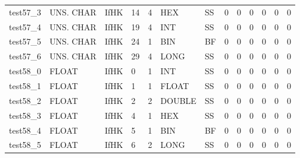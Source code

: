 \begin{longtable}{|l|l|l|p{0.5cm}|p{0.5cm}|l|p{0.5cm}|p{0.5cm}|p{0.5cm}|l|l|p{0.5cm}|l|}
test57\_3 & UNS. CHAR & IfHK & 14 & 4 & HEX & SS & 0 & 0 & 0 & 0 & 0 & 0 \\
test57\_4 & UNS. CHAR & IfHK & 19 & 4 & INT & SS & 0 & 0 & 0 & 0 & 0 & 0 \\
test57\_5 & UNS. CHAR & IfHK & 24 & 1 & BIN & BF & 0 & 0 & 0 & 0 & 0 & 0 \\
test57\_6 & UNS. CHAR & IfHK & 29 & 4 & LONG & SS & 0 & 0 & 0 & 0 & 0 & 0 \\
test58\_0 & FLOAT & IfHK & 0 & 1 & INT & SS & 0 & 0 & 0 & 0 & 0 & 0 \\
test58\_1 & FLOAT & IfHK & 1 & 1 & FLOAT & SS & 0 & 0 & 0 & 0 & 0 & 0 \\
test58\_2 & FLOAT & IfHK & 2 & 2 & DOUBLE & SS & 0 & 0 & 0 & 0 & 0 & 0 \\
test58\_3 & FLOAT & IfHK & 4 & 1 & HEX & SS & 0 & 0 & 0 & 0 & 0 & 0 \\
test58\_4 & FLOAT & IfHK & 5 & 1 & BIN & BF & 0 & 0 & 0 & 0 & 0 & 0 \\
test58\_5 & FLOAT & IfHK & 6 & 2 & LONG & SS & 0 & 0 & 0 & 0 & 0 & 0 \\
\hline
\end{longtable}
\normalsize
